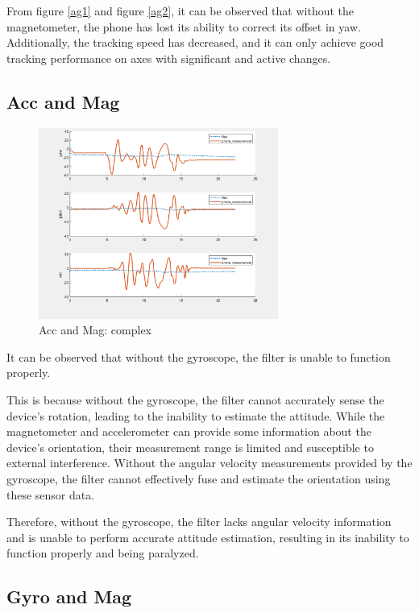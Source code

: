 From figure \ref{ag1} and figure \ref{ag2}, it can be observed that without the magnetometer, the phone has lost its ability to correct its offset in yaw. Additionally, the tracking speed has decreased, and it can only achieve good tracking performance on axes with significant and active changes.

\subsection{Acc and Mag}

\begin{figure}[H]
 \centering
 \includegraphics[width=0.7\textwidth]{images/accmag.png}
 \caption{Acc and Mag: complex}
\end{figure}

It can be observed that without the gyroscope, the filter is unable to function properly.

This is because without the gyroscope, the filter cannot accurately sense the device's rotation, leading to the inability to estimate the attitude. While the magnetometer and accelerometer can provide some information about the device's orientation, their measurement range is limited and susceptible to external interference. Without the angular velocity measurements provided by the gyroscope, the filter cannot effectively fuse and estimate the orientation using these sensor data.

Therefore, without the gyroscope, the filter lacks angular velocity information and is unable to perform accurate attitude estimation, resulting in its inability to function properly and being paralyzed.

\subsection{Gyro and Mag}

